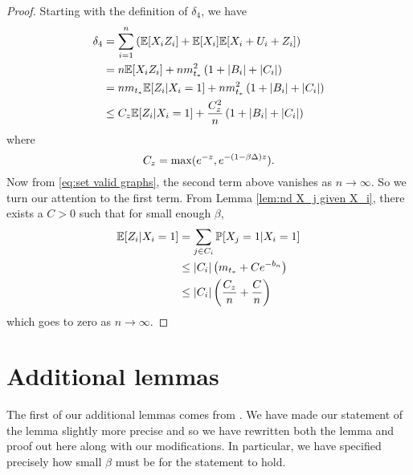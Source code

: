 	\begin{proof}
		Starting with the definition of $\delta_4$, we have
		\begin{align}
			\delta_4 &= \sum_{i = 1}^n \left(\mathbb{E}[X_i Z_i] + \mathbb{E}[X_i]\mathbb{E}[X_i + U_i + Z_i]\right)\\
				&= n \mathbb{E}[X_i Z_i] + n m_{t_*}^2 \left(1 + |B_i| + |C_i|\right)\\
				&= n m_{t_*} \mathbb{E}[Z_i | X_i = 1] + n m_{t_*}^2 \left(1 + |B_i| + |C_i|\right)\\
				&\leq C_z \mathbb{E}[Z_i | X_i = 1] + \frac{C_z^2}{n} \left(1 + |B_i| + |C_i|\right)
		\end{align}
		where 
		\begin{equation}
			C_z = \max(e^{-z}, e^{-(1 - \beta \Delta)z}).
		\end{equation}
		Now from \eqref{eq:set valid graphs}, the second term above vanishes as $n \rightarrow \infty$. So we turn our attention to the first term. From Lemma \ref{lem:nd X_j given X_i}, there exists a $C > 0$ such that for small enough $\beta$,
		\begin{align}
			\mathbb{E}[Z_i | X_i = 1] &= \sum_{j \in C_i} \mathbb{P}[X_j = 1 | X_i = 1]\\
				&\leq |C_i| \left(m_{t_*} + C e^{-b_n}\right)\\
				&\leq |C_i| \left(\frac{C_z}{n} + \frac{C}{n}\right)
		\end{align}
		which goes to zero as $n \rightarrow \infty$.
	\end{proof}

\section{Additional lemmas}
\label{sec:additional lemmas nd}
	The first of our additional lemmas comes from \cite[Lemma 3.1]{Lubetzky2015-po}. We have made our statement of the lemma slightly more precise and so we have rewritten both the lemma and proof out here along with our modifications. In particular, we have specified precisely how small $\beta$ must be for the statement to hold.

